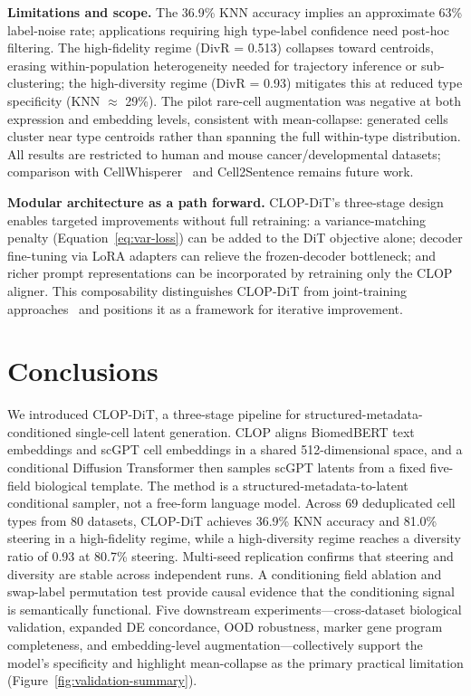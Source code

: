 \documentclass[genes,article,submit,pdftex,oneauthor]{Definitions/mdpi}
\begin{document}
\textbf{Limitations and scope.} The 36.9\% KNN accuracy implies an approximate 63\% label-noise rate; applications requiring high type-label confidence need post-hoc filtering. The high-fidelity regime (DivR = 0.513) collapses toward centroids, erasing within-population heterogeneity needed for trajectory inference or sub-clustering; the high-diversity regime (DivR = 0.93) mitigates this at reduced type specificity (KNN $\approx$ 29\%). The pilot rare-cell augmentation was negative at both expression and embedding levels, consistent with mean-collapse: generated cells cluster near type centroids rather than spanning the full within-type distribution. All results are restricted to human and mouse cancer/developmental datasets; comparison with CellWhisperer~\cite{ref-cellwhisperer} and Cell2Sentence remains future work.

\textbf{Modular architecture as a path forward.} CLOP-DiT's three-stage design enables targeted improvements without full retraining: a variance-matching penalty (Equation~\ref{eq:var-loss}) can be added to the DiT objective alone; decoder fine-tuning via LoRA adapters can relieve the frozen-decoder bottleneck; and richer prompt representations can be incorporated by retraining only the CLOP aligner. This composability distinguishes CLOP-DiT from joint-training approaches~\cite{ref-scdesign3} and positions it as a framework for iterative improvement.

\section{Conclusions}\label{sec:conclusions}

We introduced CLOP-DiT, a three-stage pipeline for structured-metadata-conditioned single-cell latent generation. CLOP aligns BiomedBERT text embeddings and scGPT cell embeddings in a shared 512-dimensional space, and a conditional Diffusion Transformer then samples scGPT latents from a fixed five-field biological template. The method is a structured-metadata-to-latent conditional sampler, not a free-form language model. Across 69 deduplicated cell types from 80 datasets, CLOP-DiT achieves 36.9\% KNN accuracy and 81.0\% steering in a high-fidelity regime, while a high-diversity regime reaches a diversity ratio of 0.93 at 80.7\% steering. Multi-seed replication confirms that steering and diversity are stable across independent runs. A conditioning field ablation and swap-label permutation test provide causal evidence that the conditioning signal is semantically functional. Five downstream experiments---cross-dataset biological validation, expanded DE concordance, OOD robustness, marker gene program completeness, and embedding-level aug\-men\-tation---collectively support the model's specificity and highlight mean-collapse as the primary practical limitation (Figure~\ref{fig:validation-summary}).
\end{document}
